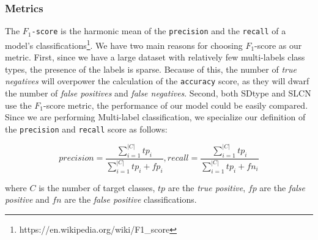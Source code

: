 \documentclass[runningheads,a4paper]{IEEEtran}
\begin{document}
\subsubsection{Metrics}
The \texttt{$F_1$-score}  is the harmonic mean of the \texttt{precision} and the \texttt{recall} of a model's classifications\footnote{https://en.wikipedia.org/wiki/F1\_score}. 
%
%
%
We have two main reasons for choosing  $F_1$-score as our metric. First, since we have a large dataset with relatively few multi-labels class types, the presence of the labels is sparse. Because of this, the number of \textit{true negatives} will overpower the calculation of the \texttt{accuracy} score, as they will dwarf the number of \textit{false positives} and \textit{false negatives}. Second, both SDtype \cite{paulheim2013type} and SLCN \cite{melo2016type} use the $F_1$-score metric, the performance of our model could be easily compared.
Since we are performing Multi-label classification, we specialize our definition of the \texttt{precision} and \texttt{recall} score as follows:

\[precision = \frac{\displaystyle\sum_{i=1}^{|C|} tp_i}{\displaystyle\sum_{i=1}^{|C|} tp_i + fp_i},       recall= \frac{\displaystyle\sum_{i=1}^{|C|} tp_i}{\displaystyle\sum_{i=1}^{|C|} tp_i + fn_i}\]


where $C$ is the number of target classes, $tp$ are the \textit{true positive}, $fp$ are the \textit{false positive} and $fn$ are the \textit{false positive} classifications. 
\end{document}
